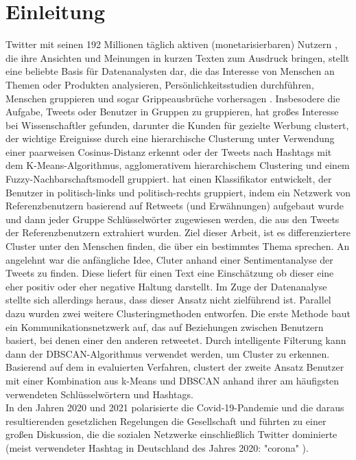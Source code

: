 \chapter{Einleitung}
\label{chap:einleitung}
Twitter mit seinen 192 Millionen täglich aktiven (monetarisierbaren) Nutzern \cite{twitter-mdau}, die ihre Ansichten und Meinungen in kurzen Texten zum Ausdruck bringen, stellt eine beliebte Basis für Datenanalysten dar, die das Interesse von Menschen an Themen oder Produkten analysieren, Persönlichkeitsstudien durchführen, Menschen gruppieren und sogar Grippeausbrüche vorhersagen \cite{Achrekar2011}.
Insbesodere die Aufgabe, Tweets oder Benutzer in Gruppen zu gruppieren, hat großes Interesse bei Wissenschaftler gefunden, darunter \cite{Friedemann2015C} die Kunden für gezielte Werbung  clustert, \cite{Ifrim2014}  der wichtige Ereignisse durch eine hierarchische Clusterung unter Verwendung einer paarweisen Cosinus-Distanz erkennt oder \cite{Miyamoto2021} der Tweets nach Hashtags mit dem K-Means-Algorithmus, agglomerativem hierarchischem Clustering und einem Fuzzy-Nachbarschaftsmodell gruppiert.
\cite{Conover2011-2} hat einen Klassifikator entwickelt, der Benutzer in politisch-links und politisch-rechts gruppiert, indem ein Netzwerk von Referenzbenutzern basierend auf Retweets (und Erwähnungen) aufgebaut wurde und dann jeder Gruppe Schlüsselwörter zugewiesen werden, die aus den Tweets der Referenzbenutzern extrahiert wurden.
Ziel dieser Arbeit, ist es differenziertere Cluster unter den Menschen finden, die über ein bestimmtes Thema sprechen.
An \cite{Kharde2016} angelehnt war die anfängliche Idee, Cluter anhand einer Sentimentanalyse der Tweets zu finden. Diese liefert für einen Text eine Einschätzung ob dieser eine eher positiv oder eher negative Haltung darstellt.
Im Zuge der Datenanalyse stellte sich allerdings heraus, dass dieser Ansatz nicht zielführend ist.
Parallel dazu wurden zwei weitere Clusteringmethoden entworfen. 
Die erste Methode baut ein Kommunikationsnetzwerk auf, das auf Beziehungen zwischen Benutzern basiert, bei denen einer den anderen retweetet. Durch intelligente Filterung kann dann der DBSCAN-Algorithmus verwendet werden, um Cluster zu erkennen.
Basierend auf dem in \cite{Godfrey2014} evaluierten Verfahren, clustert der zweite Ansatz Benutzer mit einer Kombination aus k-Means und DBSCAN anhand ihrer am häufigsten verwendeten Schlüsselwörtern und Hashtags.\\
In den Jahren 2020 und 2021 polarisierte die Covid-19-Pandemie und die daraus resultierenden gesetzlichen Regelungen die Gesellschaft und führten zu einer großen Diskussion, die die sozialen Netzwerke einschließlich Twitter dominierte (meist verwendeter Hashtag in Deutschland des Jahres 2020: "corona" \cite{top-hashtags-de}).
